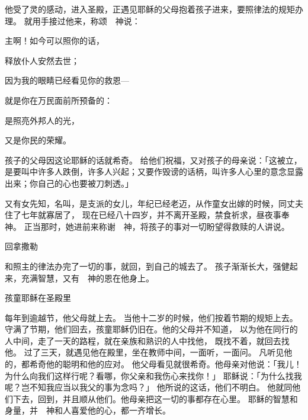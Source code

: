 {他受了{}灵的感动，进入圣殿，正遇见耶稣的父母抱着孩子进来，要照律法的规矩办理。
就用手接过他来，称颂　神说：
\par }{\Q {}主啊！如今可以照你的话，
\par }{\Q 释放仆人安然去世；
\par }{\Q {}因为我的眼睛已经看见你的救恩—
\par }{\Q {}就是你在万民面前所预备的：
\par }{\Q {}是照亮外邦人的光，
\par }{\Q 又是你民{}的荣耀。
\par }{\PP {}孩子的父母因这论耶稣的话就希奇。
给他们祝福，又对孩子的母亲{}说：「这{}被立，是要叫{}中许多人跌倒，许多人兴起；又要作毁谤的话柄，叫许多人心里的意念显露出来；你自己的心也要被刀刺透。」
\par }{\PP {}又有女先知，名叫{}，是{}支派{}的女儿，年纪已经老迈，从作童女出嫁的时候，同丈夫住了七年就寡居了，
现在已经八十四岁，并不离开圣殿，禁食祈求，昼夜事奉　神。
正当那时，她进前来称谢　神，将孩子的事对一切盼望{}得救赎的人讲说。
\par }{\SH 回拿撒勒
\par }{\PP {}和{}照主的律法办完了一切的事，就回{}，到自己的城{}去了。
孩子渐渐长大，强健起来，充满智慧，又有　神的恩在他身上。
\par }{\SH 孩童耶稣在圣殿里
\par }{\PP {}每年到逾越节，他父母就上{}去。
当他十二岁的时候，他们按着节期的规矩上去。
守满了节期，他们回去，孩童耶稣仍旧在{}。他的父母并不知道，
以为他在同行的人中间，走了一天的路程，就在亲族和熟识的人中找他，
既找不着，就回{}去找他。
过了三天，就遇见他在殿里，坐在教师中间，一面听，一面问。
凡听见他的，都希奇他的聪明和他的应对。
他父母看见就很希奇。他母亲对他说：「我儿！为什么向我们这样行呢？看哪，你父亲和我伤心来找你！」
耶稣说：「为什么找我呢？岂不知我应当以我父的事为念吗？」
他所说的这话，他们不明白。
他就同他们下去，回到{}，并且顺从他们。他母亲把这一切的事都存在心里。
耶稣的智慧和身量，并　神和人喜爱他的心，都一齐增长。

}
